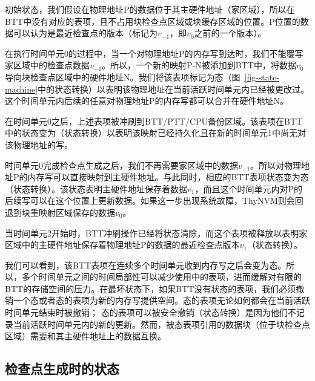 \begin{itemize}
\vspace{\noindentsep}
\noindent{} 初始状态，我们假设在物理地址P的数据位于其主硬件地址（家区域），所以在BTT中没有对应的表项，且不占用块检查点区域或块缓存区域的位置。P位置的数据可以认为是最近检查点的版本（标记为$v_{-1}$，即$v_0$之前的一个版本）。

\vspace{\noindentsep}
\noindent{} 在执行时间单元0的过程中，当一个对物理地址P的内存写到达时，我们不能覆写家区域中的检查点数据$v_{-1}$。所以，一个新的映射P-N被添加到BTT中，将数据$v_0$导向块检查点区域中的硬件地址N。我们将该表项标记为态（图~\ref{fig-state-machine}中的状态转换）以表明该物理地址在当前活跃时间单元内已经被更改过。这个时间单元内后续的任意对物理地址P的内存写都可以合并在硬件地址N。

\vspace{\noindentsep}
\noindent{} 在时间单元0之后，上述表项被冲刷到BTT/PTT/CPU备份区域。该表项在BTT中的状态变为（状态转换）以表明该映射已经持久化且在新的时间单元1中尚无对该物理地址的写。

\vspace{\noindentsep}
\noindent{} 时间单元0完成检查点生成之后，我们不再需要家区域中的数据$v_{-1}$。所以对物理地址P的内存写可以直接映射到主硬件地址。与此同时，相应的BTT表项状态变为态（状态转换）。该状态表明主硬件地址保存着数据$v_1$，而且这个时间单元内对P的后续写可以在这个位置上更新数据。如果这一步出现系统故障，ThyNVM则会回退到块重映射区域保存的数据$v_{0}$。

\vspace{\noindentsep}
\noindent{} 当时间单元2开始时，BTT冲刷操作已经将状态清除，而这个表项被释放以表明家区域中的主硬件地址保存着物理地址P的数据的最近检查点版本$v_1$（状态转换）。

我们可以看到，该BTT表项在连续多个时间单元收到内存写之后会变为态。所以，多个时间单元之间的时间局部性可以减少使用中的表项，进而缓解对有限的BTT的存储空间的压力。在最坏状态下，如果BTT没有状态的表项，我们必须撤销一个态或者态的表项为新的内存写提供空间。态的表项无论如何都会在当前活跃时间单元结束时被撤销；
态的表项可以被安全撤销（状态转换）是因为他们不记录当前活跃时间单元内的新的更新。然而，被态表项引用的数据块（位于块检查点区域）需要和其主硬件地址上的数据互换。

\subsection{检查点生成时的状态}
\label{subsec:states-ckpt}


\end{itemize}
